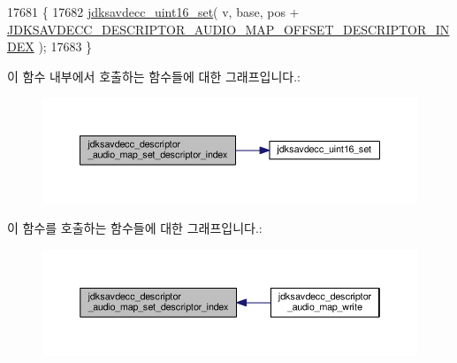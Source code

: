 \begin{DoxyCode}
17681 \{
17682     \hyperlink{group__endian_ga14b9eeadc05f94334096c127c955a60b}{jdksavdecc\_uint16\_set}( v, base, pos + 
      \hyperlink{group__descriptor__audio__map_ga59489041fea75ac82ceebf16d1c54f1c}{JDKSAVDECC\_DESCRIPTOR\_AUDIO\_MAP\_OFFSET\_DESCRIPTOR\_INDEX}
       );
17683 \}
\end{DoxyCode}


이 함수 내부에서 호출하는 함수들에 대한 그래프입니다.\+:
\nopagebreak
\begin{figure}[H]
\begin{center}
\leavevmode
\includegraphics[width=350pt]{group__descriptor__audio__map_gaa3a839e21398345dd1797f66e148fbdd_cgraph}
\end{center}
\end{figure}




이 함수를 호출하는 함수들에 대한 그래프입니다.\+:
\nopagebreak
\begin{figure}[H]
\begin{center}
\leavevmode
\includegraphics[width=350pt]{group__descriptor__audio__map_gaa3a839e21398345dd1797f66e148fbdd_icgraph}
\end{center}
\end{figure}


